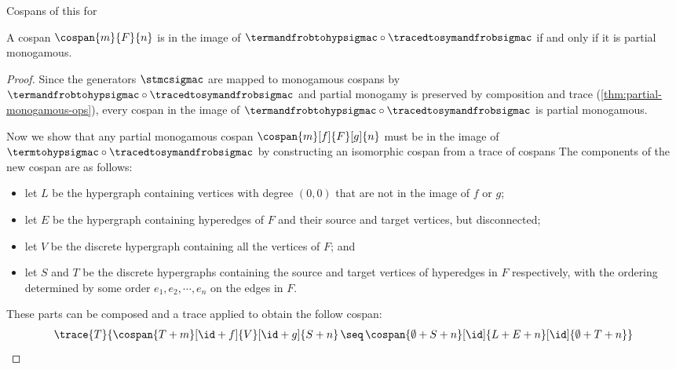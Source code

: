 Cospans of this for

\begin{theorem}\label{thm:termtohyp-image}
    A cospan \(\cospan{m}{F}{n}\) is in the image of \(
        \termandfrobtohypsigmac \circ \tracedtosymandfrobsigmac\) if
    and only if it is partial monogamous.
\end{theorem}
\begin{proof}
    Since the generators \(\stmcsigmac\) are mapped to monogamous cospans
    by \(\termandfrobtohypsigmac \circ \tracedtosymandfrobsigmac\) and partial
    monogamy is preserved by composition and trace
    (\cref{thm:partial-monogamous-ops}), every cospan in the image of
    \(\termandfrobtohypsigmac \circ \tracedtosymandfrobsigmac\) is partial
    monogamous.

    Now we show that any partial monogamous cospan \(
        \cospan{m}[f]{F}[g]{n}
    \) must be in the image of \(
        \termtohypsigmac \circ \tracedtosymandfrobsigmac
    \) by constructing an isomorphic cospan from a trace of cospans
    The components of the new cospan are as follows:
    \begin{itemize}
        \item let \(L\) be the hypergraph containing vertices with degree
                \((0,0)\) that are not in the image of \(f\) or \(g\);
        \item let \(E\) be the hypergraph containing hyperedges of \(F\) and
                their source and target vertices, but disconnected;
        \item let \(V\) be the discrete hypergraph containing all the
                vertices of \(F\); and
        \item let \(S\) and \(T\) be the discrete hypergraphs containing
                the source and target vertices of hyperedges in \(F\)
                respectively, with the ordering determined by some order
                \(e_1,e_2,\cdots,e_n\) on the edges in \(F\).
    \end{itemize}

    These parts can be composed and a trace applied to obtain the follow
    cospan:
    \begin{gather}
        \trace{T}{
            \cospan{T + m}[\id + f]{V}[\id + g]{S + n}
            \,\seq\,
            \cospan{\emptyset + S + n}[\id]{L + E + n}[\id]{\emptyset + T + n}
        }
        \label{gat:cospan}
    \end{gather}


\end{proof}
